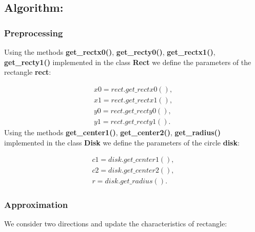 \documentclass{report}
\begin{document}
\subsection*{Algorithm:}

\subsubsection*{Preprocessing}

Using the methods  {\bfseries get\_rectx0()}, {\bfseries get\_recty0()}, {\bfseries get\_rectx1()}, {\bfseries get\_recty1()} implemented in the class {\bfseries Rect} we define the parameters of the rectangle {\bfseries rect}:

\begin{equation}
	\begin{gathered}	
		x0 = rect.get\_rectx0(),\\
		x1 = rect.get\_rectx1(),\\
		y0 = rect.get\_recty0(),\\
		y1 = rect.get\_recty1().
		\label{eq:paramrect}
	\end{gathered}
\end{equation}
Using the methods {\bfseries get\_center1()}, {\bfseries get\_center2()}, {\bfseries get\_radius()} implemented in the class {\bfseries Disk} we define the parameters of the circle {\bfseries disk}:

\begin{equation}
	\begin{gathered}
		c1 = disk.get\_center1(),\\
		c2 = disk.get\_center2(),\\
		r = disk.get\_radius().
		\label{eq:paramdisk}
	\end{gathered}
\end{equation}

\subsubsection*{Approximation}

We consider two directions and update the characteristics of rectangle:
\end{document}
